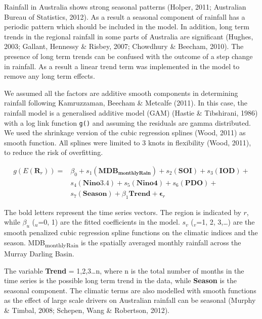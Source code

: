 \documentclass[fleqn,10pt,lineno]{wlpeerj} %
\theoremstyle{definition}
\theoremstyle{definition}
\theoremstyle{definition}
\theoremstyle{remark}
\begin{document}
Rainfall in Australia shows strong seasonal patterns (Holper, 2011;
Australian Bureau of Statistics, 2012). As a result a seasonal component
of rainfall has a periodic pattern which should be included in the
model. In addition, long term trends in the regional rainfall in some
parts of Australia are significant (Hughes, 2003; Gallant, Hennessy \&
Risbey, 2007; Chowdhury \& Beecham, 2010). The presence of long term
trends can be confused with the outcome of a step change in rainfall. As
a result a linear trend term was implemented in the model to remove any
long term effects.

We assumed all the factors are additive smooth components in determining
rainfall following Kamruzzaman, Beecham \& Metcalfe (2011). In this
case, the rainfall model is a generalised additive model (GAM) (Hastie
\& Tibshirani, 1986) with a log link function \texttt{g()} and assuming
the residuals are gamma distributed. We used the shrinkage version of
the cubic regression splines (Wood, 2011) as smooth function. All
splines were limited to 3 knots in flexibility (Wood, 2011), to reduce
the risk of overfitting. \vspace{0.5cm}

\begin{equation}
\begin{array}{lll}
g(E(\mathbf{R}_r)) = &\beta_0 + s_1(\mathbf{MDB_{monthlyRain}}) + s_2(\mathbf{SOI}) + s_3(\mathbf{IOD}) + \\
&s_4(\mathbf{Nino3.4}) + s_5(\mathbf{Nino4}) + s_6(\mathbf{PDO}) + \\
&s_7(\mathbf{Season}) + \beta_1\mathbf{Trend} + \boldsymbol{\epsilon}_r
\end{array}
\label{eq:model}
\end{equation}

The bold letters represent the time series vectors. The region is
indicated by \(r\), while \(\beta_u\) (\(_u\)=0, 1) are the fitted
coefficients in the model. \(s_v\) (\(_v\)=1, 2, 3,\ldots{}) are the
smooth penalized cubic regression spline functions on the climatic
indices and the season. MDB\textsubscript{monthlyRain} is the spatially
averaged monthly rainfall across the Murray Darling Basin.

The variable \textbf{Trend} = 1,2,3\ldots{}n, where n is the total
number of months in the time series is the possible long term trend in
the data, while \textbf{Season} is the seasonal component. The climatic
terms are also modelled with smooth functions as the effect of large
scale drivers on Australian rainfall can be seasonal (Murphy \& Timbal,
2008; Schepen, Wang \& Robertson, 2012).
\end{document}
